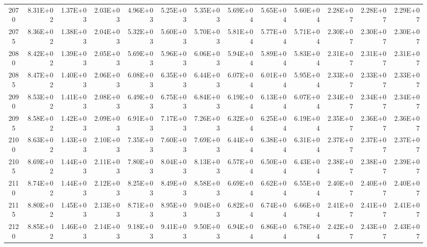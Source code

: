 \documentclass{article}
\begin{document}
\begin{table}
\begin{tabular}{crrr|rrr|rrr|rrr}
2070     & 8.31E+02   & 1.37E+03   & 2.03E+03   & 4.96E+03   & 5.25E+03   & 5.35E+03   & 5.69E+04   & 5.65E+04   & 5.60E+04   & 2.28E+07   & 2.28E+07   & 2.29E+07   \\
2075     & 8.36E+02   & 1.38E+03   & 2.04E+03   & 5.32E+03   & 5.60E+03   & 5.70E+03   & 5.81E+04   & 5.77E+04   & 5.71E+04   & 2.30E+07   & 2.30E+07   & 2.30E+07   \\
2080     & 8.42E+02   & 1.39E+03   & 2.05E+03   & 5.69E+03   & 5.96E+03   & 6.06E+03   & 5.94E+04   & 5.89E+04   & 5.83E+04   & 2.31E+07   & 2.31E+07   & 2.31E+07   \\
2085     & 8.47E+02   & 1.40E+03   & 2.06E+03   & 6.08E+03   & 6.35E+03   & 6.44E+03   & 6.07E+04   & 6.01E+04   & 5.95E+04   & 2.33E+07   & 2.33E+07   & 2.33E+07   \\
2090     & 8.53E+02   & 1.41E+03   & 2.08E+03   & 6.49E+03   & 6.75E+03   & 6.84E+03   & 6.19E+04   & 6.13E+04   & 6.07E+04   & 2.34E+07   & 2.34E+07   & 2.34E+07   \\
2095     & 8.58E+02   & 1.42E+03   & 2.09E+03   & 6.91E+03   & 7.17E+03   & 7.26E+03   & 6.32E+04   & 6.25E+04   & 6.19E+04   & 2.35E+07   & 2.36E+07   & 2.36E+07   \\
2100     & 8.63E+02   & 1.43E+03   & 2.10E+03   & 7.35E+03   & 7.60E+03   & 7.69E+03   & 6.44E+04   & 6.38E+04   & 6.31E+04   & 2.37E+07   & 2.37E+07   & 2.37E+07   \\
2105     & 8.69E+02   & 1.44E+03   & 2.11E+03   & 7.80E+03   & 8.04E+03   & 8.13E+03   & 6.57E+04   & 6.50E+04   & 6.43E+04   & 2.38E+07   & 2.38E+07   & 2.39E+07   \\
2110     & 8.74E+02   & 1.44E+03   & 2.12E+03   & 8.25E+03   & 8.49E+03   & 8.58E+03   & 6.69E+04   & 6.62E+04   & 6.55E+04   & 2.40E+07   & 2.40E+07   & 2.40E+07   \\
2115     & 8.80E+02   & 1.45E+03   & 2.13E+03   & 8.71E+03   & 8.95E+03   & 9.04E+03   & 6.82E+04   & 6.74E+04   & 6.66E+04   & 2.41E+07   & 2.41E+07   & 2.41E+07   \\
2120     & 8.85E+02   & 1.46E+03   & 2.14E+03   & 9.18E+03   & 9.41E+03   & 9.50E+03   & 6.94E+04   & 6.86E+04   & 6.78E+04   & 2.42E+07   & 2.43E+07   & 2.43E+07  
\end{tabular}   \end{table}
\end{document}
